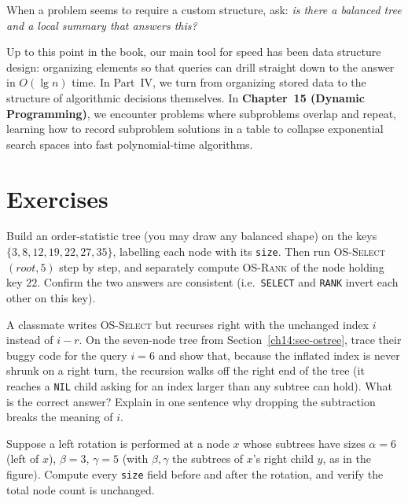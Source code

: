 When a problem seems to require a custom structure, ask:
\emph{is there a balanced tree and a local summary that answers this?}

Up to this point in the book, our main tool for speed has been data structure design:
organizing elements so that queries can drill straight down to the answer in
$O(\lg n)$ time. In Part~IV, we turn from organizing stored data to the structure of
algorithmic decisions themselves. In \textbf{Chapter~15 (Dynamic Programming)}, we
encounter problems where subproblems overlap and repeat, learning how to record
subproblem solutions in a table to collapse exponential search spaces into fast
polynomial-time algorithms.

\section{Exercises}

\begin{exercise}
Build an order-statistic tree (you may draw any balanced shape) on the keys
$\{3, 8, 12, 19, 22, 27, 35\}$, labelling each node with its \texttt{size}.
Then run \textsc{OS-Select}$(\mathit{root}, 5)$ step by step, and separately
compute \textsc{OS-Rank} of the node holding key $22$. Confirm the two answers
are consistent (i.e.\ \texttt{SELECT} and \texttt{RANK} invert each other on this
key).
\end{exercise}

\begin{exercise}
A classmate writes \textsc{OS-Select} but recurses right with the unchanged index
$i$ instead of $i - r$. On the seven-node tree from
Section~\ref{ch14:sec-ostree}, trace their buggy code for the query $i = 6$ and
show that, because the inflated index is never shrunk on a right turn, the
recursion walks off the right end of the tree (it reaches a \texttt{NIL} child
asking for an index larger than any subtree can hold). What is the correct
answer? Explain in one sentence why dropping the subtraction breaks the meaning
of $i$.
\end{exercise}

\begin{exercise}
Suppose a left rotation is performed at a node $x$ whose subtrees have sizes
$\alpha = 6$ (left of $x$), $\beta = 3$, $\gamma = 5$ (with $\beta, \gamma$ the
subtrees of $x$'s right child $y$, as in the figure). Compute every
\texttt{size} field before and after the rotation, and verify the total node
count is unchanged.
\end{exercise}

